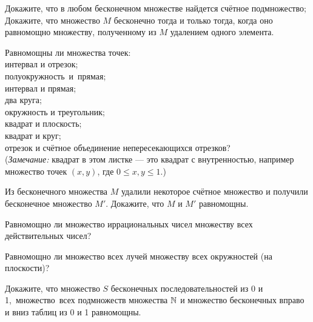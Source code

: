 \documentclass[a4paper,12pt]{article}
\begin{document}



Докажите, что
в любом бесконечном множестве найдется сч\"етное подмножество;\\
 Докажите, что множество
$M$ бесконечно тогда и только тогда, когда
оно равномощно множеству, полученному из $M$ удалением
одного элемента.

 Равномощны ли множества точек:\\
 интервал и отрезок;\\
 полуокружность~и~прямая;\\
 интервал и прямая;\\
 два круга;\\
 окружность и треугольник;\\
 квадрат %
и плоскость;\\
 квадрат и круг;\\
 отрезок и сч\"етное объединение непересекающихся отрезков?\\
{\small ({\em Замечание:} квадрат в этом листке --- это квадрат
с внутренностью, например множество точек
$(x,y)$, где $0\leq x, y\leq1$.)}


Из бесконечного множества $M$ удалили некоторое сч\"етное множество
и получили бесконечное множество $M'$. Докажите, что $M$ и $M'$ равномощны.


Равномощно ли множество иррациональных чисел множеству
всех действительных чисел?

Равномощно ли множество всех лучей множеству всех
окружностей (на плоскости)?



Докажите, что %
множество $S$ бесконечных последовательностей из 0 и
1,~\hbox{множество~всех} подмножеств множества $\mathbb{N}$
и множество бесконечных вправо и вниз таблиц из 0 и 1 равномощны.


\end{document}
